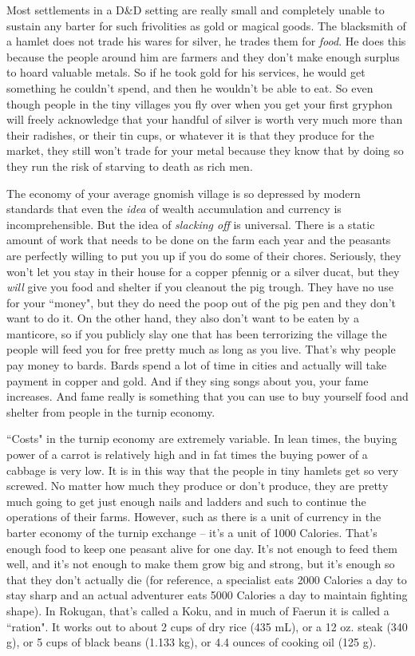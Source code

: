 Most settlements in a D\&D setting are really small and completely unable to sustain any barter for such frivolities as gold or magical goods. The blacksmith of a hamlet does not trade his wares for silver, he trades them for \textit{food}. He does this because the people around him are farmers and they don't make enough surplus to hoard valuable metals. So if he took gold for his services, he would get something he couldn't spend, and then he wouldn't be able to eat. So even though people in the tiny villages you fly over when you get your first gryphon will freely acknowledge that your handful of silver is worth very much more than their radishes, or their tin cups, or whatever it is that they produce for the market, they still won't trade for your metal because they know that by doing so they run the risk of starving to death as rich men.

The economy of your average gnomish village is so depressed by modern standards that even the \textit{idea} of wealth accumulation and currency is incomprehensible. But the idea of \textit{slacking off} is universal. There is a static amount of work that needs to be done on the farm each year and the peasants are perfectly willing to put you up if you do some of their chores. Seriously, they won't let you stay in their house for a copper pfennig or a silver ducat, but they \textit{will} give you food and shelter if you cleanout the pig trough. They have no use for your ``money", but they do need the poop out of the pig pen and they don't want to do it. On the other hand, they also don't want to be eaten by a manticore, so if you publicly slay one that has been terrorizing the village the people will feed you for free pretty much as long as you live. That's why people pay money to bards. Bards spend a lot of time in cities and actually will take payment in copper and gold. And if they sing songs about you, your fame increases. And fame really is something that you can use to buy yourself food and shelter from people in the turnip economy.

``Costs" in the turnip economy are extremely variable. In lean times, the buying power of a carrot is relatively high and in fat times the buying power of a cabbage is very low. It is in this way that the people in tiny hamlets get so very screwed. No matter how much they produce or don't produce, they are pretty much going to get just enough nails and ladders and such to continue the operations of their farms. However, such as there is a unit of currency in the barter economy of the turnip exchange -- it's a unit of 1000 Calories. That's enough food to keep one peasant alive for one day. It's not enough to feed them well, and it's not enough to make them grow big and strong, but it's enough so that they don't actually die (for reference, a specialist eats 2000 Calories a day to stay sharp and an actual adventurer eats 5000 Calories a day to maintain fighting shape). In Rokugan, that's called a Koku, and in much of Faerun it is called a ``ration". It works out to about 2 cups of dry rice (435 mL), or a 12 oz. steak (340 g), or 5 cups of black beans (1.133 kg), or 4.4 ounces of cooking oil (125 g).

